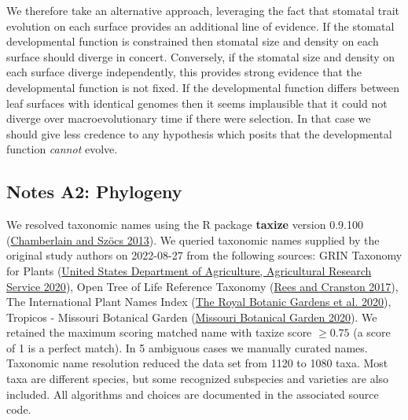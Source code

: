 \documentclass[
  12pt,
]{article}
\begin{document}
We therefore take an alternative approach, leveraging the fact that stomatal trait evolution on each surface provides an additional line of evidence. If the stomatal developmental function is constrained then stomatal size and density on each surface should diverge in concert. Conversely, if the stomatal size and density on each surface diverge independently, this provides strong evidence that the developmental function is not fixed. If the developmental function differs between leaf surfaces with identical genomes then it seems implausible that it could not diverge over macroevolutionary time if there were selection. In that case we should give less credence to any hypothesis which posits that the developmental function \emph{cannot} evolve.

\clearpage

\hypertarget{notes-a2-phylogeny}{%
\subsection{Notes A2: Phylogeny}\label{notes-a2-phylogeny}}

We resolved taxonomic names using the R package \textbf{taxize} version 0.9.100 (\protect\hyperlink{ref-chamberlain_taxize_2013}{Chamberlain and Szöcs 2013}). We queried taxonomic names supplied by the original study authors on 2022-08-27 from the following sources: GRIN Taxonomy for Plants (\protect\hyperlink{ref-united_states_department_of_agriculture_agricultural_research_service_germplasm_2020}{United States Department of Agriculture, Agricultural Research Service 2020}), Open Tree of Life Reference Taxonomy (\protect\hyperlink{ref-rees_automated_2017}{Rees and Cranston 2017}), The International Plant Names Index (\protect\hyperlink{ref-the_royal_botanic_gardens_international_2020}{The Royal Botanic Gardens et al. 2020}), Tropicos - Missouri Botanical Garden (\protect\hyperlink{ref-missouri_botanical_garden_tropicos_2020}{Missouri Botanical Garden 2020}). We retained the maximum scoring matched name with taxize score \(\ge 0.75\) (a score of 1 is a perfect match). In 5 ambiguous cases we manually curated names. Taxonomic name resolution reduced the data set from 1120 to 1080 taxa. Most taxa are different species, but some recognized subspecies and varieties are also included. All algorithms and choices are documented in the associated source code.
\end{document}
